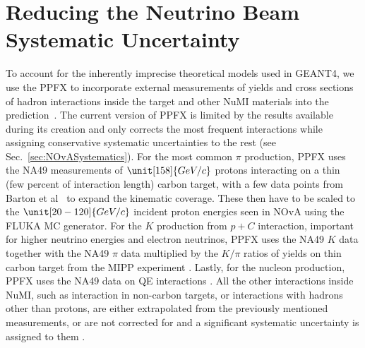 \label{sec:ListOfAuthorsContributions}

\section*{Reducing the Neutrino Beam Systematic Uncertainty}
To account for the inherently imprecise theoretical models used in GEANT4, we use the PPFX to incorporate external measurements of yields and cross sections of hadron interactions inside the target and other NuMI materials into the prediction~\cite{NuMIFlux.pdf}. The current version of PPFX is limited by the results available during its creation and only corrects the most frequent interactions while assigning conservative systematic uncertainties to the rest (see Sec.~\ref{sec:NOvASystematics}). For the most common $\pi$ production, PPFX uses the NA49 measurements \cite{NA49:Inclusive_production_of_charged_pions.pdf} of $\unit[158]{GeV/c}$ protons interacting on a thin (few percent of interaction length) carbon target, with a few data points from Barton et al~\cite{BartonHadProd1983.pdf} to expand the kinematic coverage. These then have to be scaled to the $\unit[20-120]{GeV/c}$ incident proton energies seen in NOvA using the FLUKA \cite{FLUKA_01,FLUKA_02} MC generator. For the $K$ production from $p+C$ interaction, important for higher neutrino energies and electron neutrinos, PPFX uses the NA49 $K$ data \cite{NA49DataKaons.pdf} together with the NA49 $\pi$ data \cite{NA49:Inclusive_production_of_charged_pions.pdf} multiplied by the $K/\pi$ ratios of yields on thin carbon target from the MIPP experiment \cite{pionToKaonIn_pC.pdf}. Lastly, for the nucleon production, PPFX uses the NA49 data on QE interactions \cite{NA49pc-proton2013.pdf}. All the other interactions inside NuMI, such as interaction in non-carbon targets, or interactions with hadrons other than protons, are either extrapolated from the previously mentioned measurements, or are not corrected for and a significant systematic uncertainty is assigned to them \cite{NuMIFlux.pdf}.

